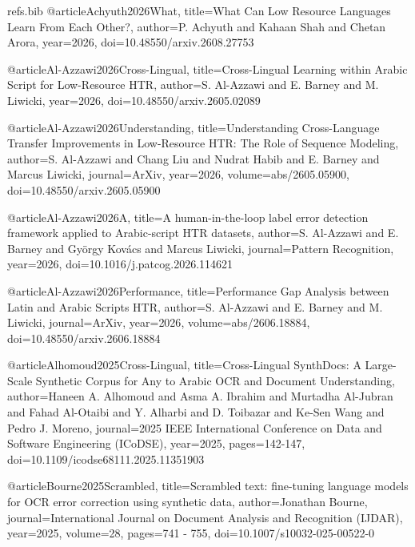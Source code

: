 
\begin{filecontents}{refs.bib}
    @article{Achyuth2026What,
    title={What Can Low Resource Languages Learn From Each Other?},
    author={P. Achyuth and Kahaan Shah and Chetan Arora},
    year={2026},
    doi={10.48550/arxiv.2608.27753}
    }
    
    @article{Al-Azzawi2026Cross-Lingual,
    title={Cross-Lingual Learning within Arabic Script for Low-Resource HTR},
    author={S. Al-Azzawi and E. Barney and M. Liwicki},
    year={2026},
    doi={10.48550/arxiv.2605.02089}
    }
    
    @article{Al-Azzawi2026Understanding,
    title={Understanding Cross-Language Transfer Improvements in Low-Resource HTR: The Role of Sequence Modeling},
    author={S. Al-Azzawi and Chang Liu and Nudrat Habib and E. Barney and Marcus Liwicki},
    journal={ArXiv},
    year={2026},
    volume={abs/2605.05900},
    doi={10.48550/arxiv.2605.05900}
    }
    
    @article{Al-Azzawi2026A,
    title={A human-in-the-loop label error detection framework applied to Arabic-script HTR datasets},
    author={S. Al-Azzawi and E. Barney and György Kovács and Marcus Liwicki},
    journal={Pattern Recognition},
    year={2026},
    doi={10.1016/j.patcog.2026.114621}
    }
    
    @article{Al-Azzawi2026Performance,
    title={Performance Gap Analysis between Latin and Arabic Scripts HTR},
    author={S. Al-Azzawi and E. Barney and M. Liwicki},
    journal={ArXiv},
    year={2026},
    volume={abs/2606.18884},
    doi={10.48550/arxiv.2606.18884}
    }
    
    @article{Alhomoud2025Cross-Lingual,
    title={Cross-Lingual SynthDocs: A Large-Scale Synthetic Corpus for Any to Arabic OCR and Document Understanding},
    author={Haneen A. Alhomoud and Asma A. Ibrahim and Murtadha Al-Jubran and Fahad Al-Otaibi and Y. Alharbi and D. Toibazar and Ke-Sen Wang and Pedro J. Moreno},
    journal={2025 IEEE International Conference on Data and Software Engineering (ICoDSE)},
    year={2025},
    pages={142-147},
    doi={10.1109/icodse68111.2025.11351903}
    }
    
    @article{Bourne2025Scrambled,
    title={Scrambled text: fine-tuning language models for OCR error correction using synthetic data},
    author={Jonathan Bourne},
    journal={International Journal on Document Analysis and Recognition (IJDAR)},
    year={2025},
    volume={28},
    pages={741 - 755},
    doi={10.1007/s10032-025-00522-0}
    }
    

\end{filecontents}
